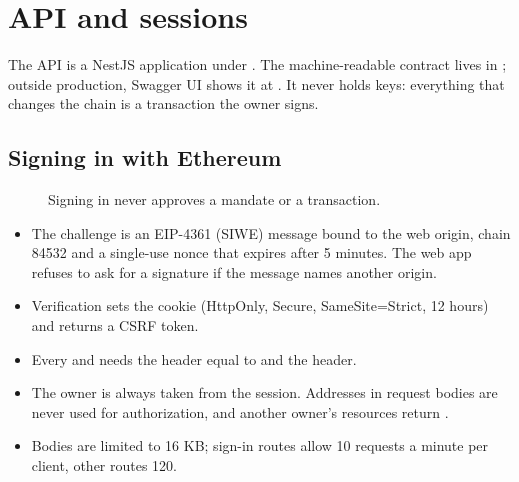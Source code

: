\chapter{API and sessions}\label{ch:api}

The API is a NestJS application under . The machine-readable contract lives in ; outside production, Swagger UI shows it at . It never holds keys: everything that changes the chain is a transaction the owner signs.

\section{Signing in with Ethereum}

\begin{figure}[htbp]
\centering
{}
\caption{Signing in never approves a mandate or a transaction.}
\end{figure}

\begin{itemize}
  \item The challenge is an EIP-4361 (SIWE) message bound to the web origin, chain 84532 and a single-use nonce that expires after 5 minutes. The web app refuses to ask for a signature if the message names another origin.
  \item Verification sets the  cookie (HttpOnly, Secure, SameSite=Strict, 12 hours) and returns a CSRF token.
  \item Every  and  needs the  header equal to  and the  header.
  \item The owner is always taken from the session. Addresses in request bodies are never used for authorization, and another owner's resources return .
  \item Bodies are limited to 16 KB; sign-in routes allow 10 requests a minute per client, other routes 120.
\end{itemize}

